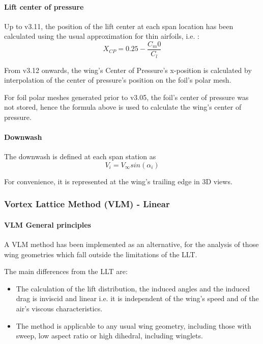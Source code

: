 \documentclass[a4paper,twoside,12pt,dvips]{article}
\begin{document}
\paragraph{Lift center of pressure}

Up to v3.11, the position of the lift center at each span location has
been calculated using the usual approximation for thin airfoils, i.e.
: \[X_{CP} = 0.25 - \frac{C_m0}{C_l}\]

From v3.12 onwards, the wing's Center of Pressure's x-position is
calculated by interpolation of the center of pressure's position on
the foil's polar mesh.

For foil polar meshes generated prior to v3.05, the foil's center of
pressure was not stored, hence the formula above is used to calculate
the wing's center of pressure.

\paragraph{Downwash}

The downwash is defined at each span station as
\[V_i = V_\infty sin(\alpha_i)\]

For convenience, it is represented at the wing's trailing edge in 3D
views.

\subsubsection{Vortex Lattice Method (VLM) - Linear }

\paragraph{VLM General principles}

A VLM method has been implemented as an alternative, for the analysis of
those wing geometries which fall outside the limitations of the LLT.

The main differences from the LLT are: 

\begin{itemize}
\item The calculation of the lift distribution, the induced
angles and the induced drag is inviscid and linear i.e. it is
independent of the wing's speed and of the
air's viscous characteristics.
\item The method is applicable to any usual wing geometry,
including those with sweep, low aspect ratio or high dihedral,
including winglets.
\end{itemize}
\end{document}
